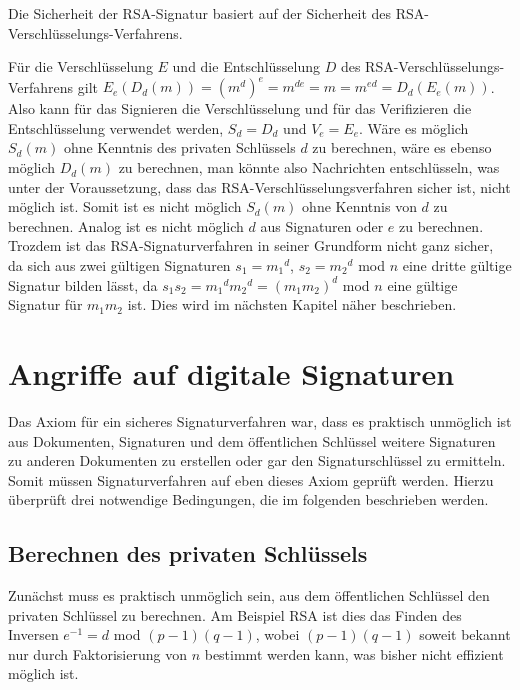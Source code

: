\documentclass[a4paper,12pt,oneside]{scrreprt}
\begin{document}
Die Sicherheit der RSA-Signatur basiert auf der Sicherheit des RSA-Verschlüsselungs-Verfahrens. 

Für die Verschlüsselung $E$ und die Entschlüsselung $D$ des RSA-Verschlüsselungs-Verfahrens gilt $E_e(D_d(m)) = (m^d)^e = m^{de} = m = m^{ed} = D_d(E_e(m))$. Also kann für das Signieren die Verschlüsselung und für das Verifizieren die Entschlüsselung verwendet werden, $S_d = D_d$ und $V_e = E_e$. Wäre es möglich $S_d(m)$ ohne Kenntnis des privaten Schlüssels $d$ zu berechnen, wäre es ebenso möglich $D_d(m)$ zu berechnen, man könnte also Nachrichten entschlüsseln, was unter der Voraussetzung, dass das RSA-Verschlüsselungsverfahren sicher ist, nicht möglich ist. Somit ist es nicht möglich $S_d(m)$ ohne Kenntnis von $d$ zu berechnen. Analog ist es nicht möglich $d$ aus Signaturen oder $e$ zu berechnen. Trozdem ist das RSA-Signaturverfahren in seiner Grundform nicht ganz sicher, da sich aus zwei gültigen Signaturen $s_1 = {m_1}^d$, $s_2 = {m_2}^d$ mod $n$ eine dritte gültige Signatur bilden lässt, da $s_1 s_2 = {m_1}^d {m_2}^d = (m_1 m_2)^d$ mod $n$ eine gültige Signatur für $m_1 m_2$ ist. Dies wird im nächsten 
Kapitel näher beschrieben. 






\chapter{Angriffe auf digitale Signaturen}

Das Axiom für ein sicheres Signaturverfahren war, dass es praktisch unmöglich ist aus Dokumenten, Signaturen und dem öffentlichen Schlüssel weitere Signaturen zu anderen Dokumenten zu erstellen oder gar den Signaturschlüssel zu ermitteln. Somit müssen Signaturverfahren auf eben dieses Axiom geprüft werden. Hierzu überprüft \cite{buchmann2010einfa1} drei notwendige Bedingungen, die im folgenden beschrieben werden. 

\section{Berechnen des privaten Schlüssels}

Zunächst muss es praktisch unmöglich sein, aus dem öffentlichen Schlüssel den privaten Schlüssel zu berechnen. Am Beispiel RSA ist dies das Finden des Inversen $e^{-1} = d$ mod $(p-1)(q-1)$, wobei $(p-1)(q-1)$ soweit bekannt nur durch Faktorisierung von $n$ bestimmt werden kann, was bisher nicht effizient möglich ist. 
\end{document}
